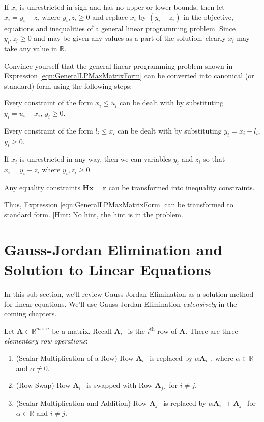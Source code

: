 If $x_i$ is unrestricted in sign and has no upper or lower bounds, then let $x_i = y_i - z_i$ where $y_i, z_i \geq 0$ and replace $x_i$ by $(y_i-z_i)$ in the objective, equations and inequalities of a general linear programming problem. Since $y_i, z_i \geq 0$ and may be given any values as a part of the solution, clearly $x_i$ may take any value in $\mathbb{R}$. 
\begin{exercise} Convince yourself that the general linear programming problem shown in Expression \ref{eqn:GeneralLPMaxMatrixForm} can be converted into canonical (or standard) form using the following steps:
\begin{enumerate*}
\item Every constraint of the form $x_i \leq u_i$ can be dealt with by substituting $y_i = u_i - x_i$, $y_i \geq 0$.
\item Every constraint of the form $l_i \leq x_i$ can be dealt with by substituting $y_i = x_i - l_i$, $y_i \geq 0$.
\item If $x_i$ is unrestricted in any way, then we can variables $y_i$ and $z_i$ so that $x_i = y_i - z_i$ where $y_i, z_i \geq 0$.
\item Any equality constraints $\mathbf{H}\mathbf{x} = \mathbf{r}$ can be transformed into inequality constraints.
\end{enumerate*}
Thus, Expression \ref{eqn:GeneralLPMaxMatrixForm} can be transformed to standard form. [Hint: No hint, the hint is in the problem.]
\end{exercise}

\section{Gauss-Jordan Elimination and Solution to Linear Equations}
In this sub-section, we'll review Gauss-Jordan Elimination as a solution method for linear equations. We'll use Gauss-Jordan Elimination \textit{extensively} in the coming chapters. 

\begin{definition} Let $\mathbf{A} \in \mathbb{R}^{m \times n}$ be a matrix. Recall $\mathbf{A}_{i \cdot}$ is the $i^\text{th}$ row of $\mathbf{A}$. There are three \textit{elementary row operations}:
\begin{enumerate}
\item (Scalar Multiplication of a Row) Row $\mathbf{A}_{i \cdot}$ is replaced by $\alpha \mathbf{A}_{i \cdot}$, where $\alpha \in \mathbb{R}$ and $\alpha \neq 0$. 
\item (Row Swap) Row $\mathbf{A}_{i \cdot}$ is swapped with Row $\mathbf{A}_{j \cdot}$ for $i \neq j$.
\item (Scalar Multiplication and Addition) Row $\mathbf{A}_{j \cdot}$ is replaced by $\alpha \mathbf{A}_{i \cdot} + \mathbf{A}_{j \cdot}$ for $\alpha \in \mathbb{R}$ and $i \neq j$.
\end{enumerate}
\end{definition}

